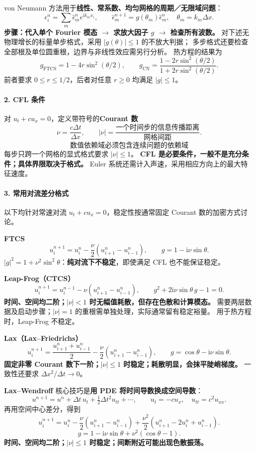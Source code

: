 von Neumann 方法用于\textbf{线性、常系数、均匀网格的周期／无限域问题}：
\[
 \epsilon_i^n=\sum_m\widehat\epsilon_m^n e^{\mathrm i k_mx_i},\qquad
 \widehat\epsilon_m^{n+1}=g(\theta_m)\widehat\epsilon_m^n,
 \quad\theta_m=k_m\Delta x.
\]
\textbf{步骤：代入单个 Fourier 模态 $\to$ 求放大因子 $g$ $\to$ 检查所有波数。}
对下述无物理增长的标量单步格式，采用 $|g(\theta)|\le1$ 的不放大判据；
多步格式还要检查全部根及单位圆重根，边界与非线性效应需另行分析。
热方程的结果为
\[
 g_{\mathrm{FTCS}}=1-4r\sin^2(\theta/2),\qquad
 g_{\mathrm{CN}}=\frac{1-2r\sin^2(\theta/2)}{1+2r\sin^2(\theta/2)}.
\]
前者要求 $0\le r\le1/2$，后者对任意 $r\ge0$ 均满足 $|g|\le1$。

\paragraph{2. CFL 条件}
对 $u_t+cu_x=0$，定义带符号的\textbf{Courant 数}
\[
 \nu=\frac{c\Delta t}{\Delta x},\qquad
 |\nu|=\frac{\text{一个时间步的信息传播距离}}{\text{网格间距}}.
\]
\[
 \boxed{\text{数值依赖域必须包含连续问题的依赖域}}
\]
每步只跨一个网格的显式格式要求 $|\nu|\le1$。
\textbf{CFL 是必要条件，一般不是充分条件；具体界限取决于格式。}
Euler 系统还需计入声速，采用相应方向上的最大特征速度。

\paragraph{3. 常用对流差分格式}
以下均针对常速对流 $u_t+cu_x=0$，稳定性按通常固定 Courant 数的加密方式讨论。

\textbf{FTCS}
\[
 u_i^{n+1}=u_i^n-\frac\nu2(u_{i+1}^n-u_{i-1}^n),\qquad
 g=1-\mathrm i\nu\sin\theta.
\]
$|g|^2=1+\nu^2\sin^2\theta$：\textbf{纯对流下不稳定}，即使满足 CFL 也不能保证稳定。

\textbf{Leap-Frog（CTCS）}
\[
 u_i^{n+1}=u_i^{n-1}-\nu(u_{i+1}^n-u_{i-1}^n),\qquad
 g^2+2\mathrm i\nu\sin\theta\,g-1=0.
\]
\textbf{时间、空间均二阶；$|\nu|<1$ 时无幅值耗散，但存在色散和计算模态。}
需要两层数据及启动步骤；$|\nu|=1$ 的重根需单独处理，实际通常留有稳定裕量。
用于热方程时，Leap-Frog 不稳定。

\textbf{Lax（Lax--Friedrichs）}
\[
 u_i^{n+1}=\frac{u_{i+1}^n+u_{i-1}^n}{2}
          -\frac\nu2(u_{i+1}^n-u_{i-1}^n),\qquad
 g=\cos\theta-\mathrm i\nu\sin\theta.
\]
\textbf{固定非零 Courant 数下一阶；$|\nu|\le1$ 时稳定；耗散明显，会抹平陡峭梯度。}
一致性还要求 $\Delta x^2/\Delta t\to0$。

\textbf{Lax--Wendroff}
核心技巧是\textbf{用 PDE 将时间导数换成空间导数}：
\[
 u^{n+1}=u^n+\Delta t\,u_t+\tfrac12\Delta t^2u_{tt}+\cdots,
 \qquad u_t=-cu_x,\quad u_{tt}=c^2u_{xx}.
\]
再用空间中心差分，得到
\begin{equation}
 u_i^{n+1}=u_i^n-\frac\nu2(u_{i+1}^n-u_{i-1}^n)
          +\frac{\nu^2}{2}(u_{i+1}^n-2u_i^n+u_{i-1}^n).
 \label{eq:cfd-lax-wendroff}
\end{equation}
\[
 g=1-\mathrm i\nu\sin\theta+\nu^2(\cos\theta-1).
\]
\textbf{时间、空间均二阶；$|\nu|\le1$ 时稳定；间断附近可能出现色散振荡。}

